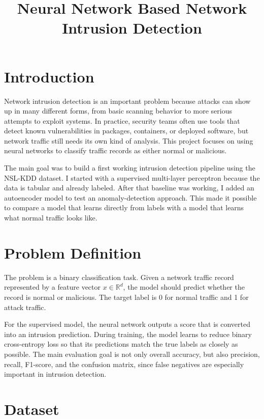 \documentclass[11pt]{article}
\title{Neural Network Based Network Intrusion Detection}
\author{}
\date{}
\begin{document}
\maketitle

\section{Introduction}

Network intrusion detection is an important problem because attacks can show up in many different forms, from basic scanning behavior to more serious attempts to exploit systems. In practice, security teams often use tools that detect known vulnerabilities in packages, containers, or deployed software, but network traffic still needs its own kind of analysis. This project focuses on using neural networks to classify traffic records as either normal or malicious.

The main goal was to build a first working intrusion detection pipeline using the NSL-KDD dataset. I started with a supervised multi-layer perceptron because the data is tabular and already labeled. After that baseline was working, I added an autoencoder model to test an anomaly-detection approach. This made it possible to compare a model that learns directly from labels with a model that learns what normal traffic looks like.

\section{Problem Definition}

The problem is a binary classification task. Given a network traffic record represented by a feature vector $x \in \mathbb{R}^d$, the model should predict whether the record is normal or malicious. The target label is 0 for normal traffic and 1 for attack traffic.

For the supervised model, the neural network outputs a score that is converted into an intrusion prediction. During training, the model learns to reduce binary cross-entropy loss so that its predictions match the true labels as closely as possible. The main evaluation goal is not only overall accuracy, but also precision, recall, F1-score, and the confusion matrix, since false negatives are especially important in intrusion detection.

\section{Dataset}
\end{document}
